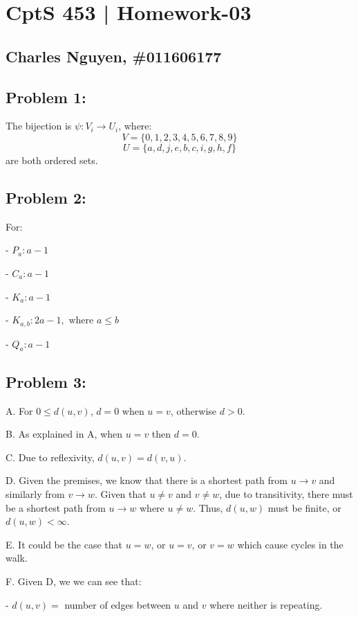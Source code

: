 \documentclass[12pt,letterpaper]{article}
\begin{document}
\section*{CptS 453 | Homework-03 }
\subsection*{Charles Nguyen, \#011606177 }

\subsection*{Problem 1:}


The bijection is $\psi: V_i \rightarrow U_i $, where:
\[ V = \{0,1,2,3,4,5,6,7,8,9\} \]
\[ U = \{a,d,j,e,b,c,i,g,h,f\} \]
are both ordered sets.

\subsection*{Problem 2:}

For:

- $P_a: a - 1$

- $C_a: a - 1$

- $K_a: a - 1$

- $K_{a,b}: 2a - 1, \mbox{ where } a \leq b$

- $Q_a: a - 1$

\subsection*{Problem 3:}

A. For $0 \leq d(u,v)$, $d = 0$ when $u = v$, otherwise $d > 0$.

B. As explained in A, when $u = v$ then $d = 0$.

C. Due to reflexivity, $d(u,v) = d(v,u)$.

D. Given the premises, we know that there is a shortest path from $u
\rightarrow v$ and similarly from $v \rightarrow w$. Given that $u \neq v$ and
$v \neq w$, due to transitivity, there must be a shortest path from $u
\rightarrow w$ where $u \neq w$. Thus, $d(u,w)$ must be finite, or $d(u,w)
< \infty$.

E. It could be the case that $u = w$, or $u = v$, or $v = w$ which cause
cycles in the walk.

F. Given D, we we can see that:

- $d(u,v) = $ number of edges between $u$ and $v$ where neither is repeating.
\end{document}
